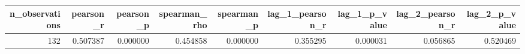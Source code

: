 \begin{tabular}{rrrrrrrrr}
\toprule
n\_observations & pearson\_r & pearson\_p & spearman\_rho & spearman\_p & lag\_1\_pearson\_r & lag\_1\_p\_value & lag\_2\_pearson\_r & lag\_2\_p\_value \\
\midrule
132 & 0.507387 & 0.000000 & 0.454858 & 0.000000 & 0.355295 & 0.000031 & 0.056865 & 0.520469 \\
\bottomrule
\end{tabular}
